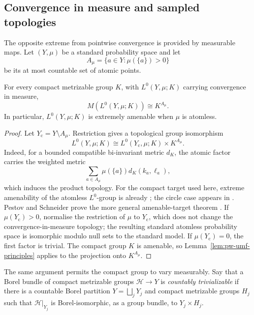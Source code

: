 \subsection{Convergence in measure and sampled topologies}
\label{sec:pw-measure}

The opposite extreme from pointwise convergence is provided by measurable
maps. Let \((Y,\mu)\) be a standard probability space and let
\[
A_\mu=\{a\in Y:\mu(\{a\})>0\}
\]
be its at most countable set of atomic points.

\begin{proposition}\label{prop:pw-l0-umf}
For every compact metrizable group \(K\), with \(L^0(Y,\mu;K)\) carrying
convergence in measure,
\[
M(L^0(Y,\mu;K))\cong K^{A_\mu}.
\]
In particular, \(L^0(Y,\mu;K)\) is extremely amenable when \(\mu\) is
atomless.
\end{proposition}

\begin{proof}
Let \(Y_{\mathrm c}=Y\setminus A_\mu\). Restriction gives a topological group
isomorphism
\[
L^0(Y,\mu;K)
\cong L^0(Y_{\mathrm c},\mu;K)\times K^{A_\mu}.
\]
Indeed, for a bounded compatible bi-invariant metric \(d_K\), the atomic
factor carries the weighted metric
\[
\sum_{a\in A_\mu}\mu(\{a\})d_K(k_a,\ell_a),
\]
which induces the product topology. For the compact target used here, extreme amenability of the atomless
\(L^0\)-group is already \cite[Theorem~2.20]{GiordanoPestov2007}; the circle case appears
in \cite[Theorems~1.2--1.3]{Glasner1998}. Pestov and Schneider prove the more
general amenable-target theorem \cite[Theorem~1.1]{PestovSchneider2017}. If \(\mu(Y_{\mathrm c})>0\), normalise the
restriction of \(\mu\) to \(Y_{\mathrm c}\), which does not change the
convergence-in-measure topology; the resulting standard atomless probability
space is isomorphic modulo null sets to the standard model. If
\(\mu(Y_{\mathrm c})=0\), the first factor is trivial. The compact group \(K\)
is amenable, so Lemma~\ref{lem:pw-umf-principles} applies to the projection onto
\(K^{A_\mu}\).
\end{proof}

The same argument permits the compact group to vary measurably.  Say that a
Borel bundle of compact metrizable groups \(\mathcal H\to Y\) is
\emph{countably trivializable} if there is a countable Borel partition
\(Y=\bigsqcup_jY_j\) and compact metrizable groups \(H_j\) such that
\(\mathcal H|_{Y_j}\) is Borel-isomorphic, as a group bundle, to
\(Y_j\times H_j\).

